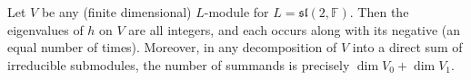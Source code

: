 Let $V$ be any (finite dimensional) $L$-module for $L = \mathfrak{sl}(2, \mathbb{F})$. Then the eigenvalues of $h$ on $V$ are all integers, and each occurs along with its negative (an equal number of times). Moreover, in any decomposition of $V$ into a direct sum of irreducible submodules, the number of summands is precisely $\dim V_0 + \dim V_1$.
